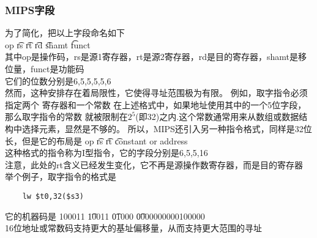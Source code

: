 \documentclass{ctexart}
\begin{document}
\subsubsection{MIPS字段}
为了简化，把以上字段命名如下\\
op \t rs \t rt \t rd \t shamt \t funct \\
其中op是操作码，rs是源1寄存器，rt是源2寄存器，rd是目的寄存器，shamt是移位量，funct是功能码\\
它们的位数分别是6,5,5,5,5,6\\
然而，这种安排存在着局限性，它使得寻址范围极为有限。
例如，取字指令必须指定两个
寄存器和一个常数 在上述格式中，如果地址使用其中的一个5位字段，那么取字指令的常数
就被限制在$2^5$(即32)之内.这个常数通常用来从数组或数据结构中选择元素，显然是不够的。
所以，MIPS还引入另一种指令格式，同样是32位长，但是它的布局是
op \t rs \t rt \t constant or address \\
这种格式的指令称为I型指令，它的字段分别是6,5,5,16\\
注意，此处的rt含义已经发生变化，它不再是源操作数寄存器，而是目的寄存器\\
举个例子，取字指令的格式是
\begin{lstlisting}
    lw $t0,32($s3)
\end{lstlisting}
它的机器码是
100011 \t 10011 \t 01000 \t 0000000000100000 \\
16位地址或常数码支持更大的基址偏移量，从而支持更大范围的寻址\\
\end{document}
